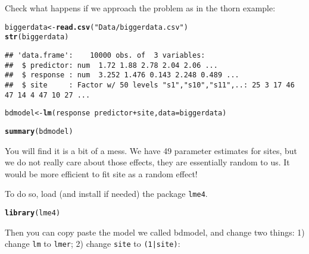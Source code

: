\documentclass[12pt,a4paper]{scrartcl}\usepackage[]{graphicx}\usepackage[]{color}
\makeatletter
\newcommand{\hlstr}[1]{\textcolor[rgb]{0.192,0.494,0.8}{#1}}%
\newcommand{\hlopt}[1]{\textcolor[rgb]{0,0,0}{#1}}%
\newcommand{\hlstd}[1]{\textcolor[rgb]{0.345,0.345,0.345}{#1}}%
\newcommand{\hlkwb}[1]{\textcolor[rgb]{0.69,0.353,0.396}{#1}}%
\newcommand{\hlkwc}[1]{\textcolor[rgb]{0.333,0.667,0.333}{#1}}%
\newcommand{\hlkwd}[1]{\textcolor[rgb]{0.737,0.353,0.396}{\textbf{#1}}}%
\newenvironment{kframe}{%
 \def\at@end@of@kframe{}%
 \ifinner\ifhmode%
  \def\at@end@of@kframe{\end{minipage}}%
  \begin{minipage}{\columnwidth}%
 \fi\fi%
 \def\FrameCommand##1{\hskip\@totalleftmargin \hskip-\fboxsep
 \colorbox{shadecolor}{##1}\hskip-\fboxsep
     \hskip-\linewidth \hskip-\@totalleftmargin \hskip\columnwidth}%
 \MakeFramed {\advance\hsize-\width
   \@totalleftmargin\z@ \linewidth\hsize
   \@setminipage}}%
 {\par\unskip\endMakeFramed%
 \at@end@of@kframe}
\newenvironment{knitrout}{}{} %
\makeatother
\begin{document}
Check what happens if we approach the problem as in the thorn example:
\begin{knitrout}
\color{fgcolor}\begin{kframe}
\begin{alltt}
\hlstd{biggerdata} \hlkwb{<-} \hlkwd{read.csv}\hlstd{(}\hlstr{"Data/biggerdata.csv"}\hlstd{)}
\hlkwd{str}\hlstd{(biggerdata)}
\end{alltt}
\begin{verbatim}
## 'data.frame':	10000 obs. of  3 variables:
##  $ predictor: num  1.72 1.88 2.78 2.04 2.06 ...
##  $ response : num  3.252 1.476 0.143 2.248 0.489 ...
##  $ site     : Factor w/ 50 levels "s1","s10","s11",..: 25 3 17 46 47 14 4 47 10 27 ...
\end{verbatim}
\begin{alltt}
\hlstd{bdmodel} \hlkwb{<-} \hlkwd{lm}\hlstd{(response} \hlopt{~} \hlstd{predictor} \hlopt{+} \hlstd{site,} \hlkwc{data} \hlstd{= biggerdata)}
\end{alltt}
\end{kframe}
\end{knitrout}
\begin{knitrout}
\color{fgcolor}\begin{kframe}
\begin{alltt}
\hlkwd{summary}\hlstd{(bdmodel)}
\end{alltt}
\end{kframe}
\end{knitrout}

You will find it is a bit of a mess. We have 49 parameter estimates for sites, but we do not really care about those effects, they are essentially random to us. It would be more efficient to fit site as a random effect!

To do so, load (and install if needed) the package \texttt{lme4}. 
\begin{knitrout}
\color{fgcolor}\begin{kframe}
\begin{alltt}
\hlkwd{library}\hlstd{(lme4)}
\end{alltt}


{\ttfamily\noindent\itshape\color{messagecolor}{\#\# Loading required package: Matrix}}\end{kframe}
\end{knitrout}
Then you can copy paste the model we called bdmodel, and change two things: 1) change \texttt{lm} to \texttt{lmer}; 2) change \texttt{site} to \texttt{(1|site)}:
\end{document}
